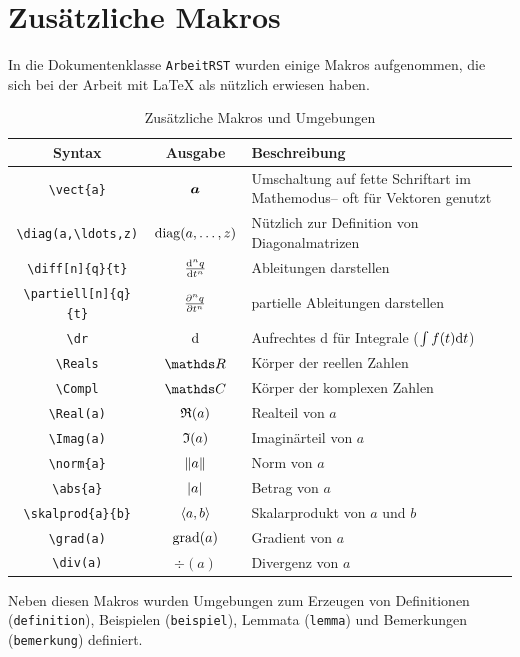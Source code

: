 \section{Zusätzliche Makros}
In die Dokumentenklasse \texttt{ArbeitRST} wurden einige Makros aufgenommen, die sich bei der Arbeit mit \LaTeX{} als nützlich erwiesen haben.
\begin{table}[htbp]
\centering
\caption{Zusätzliche Makros und Umgebungen}
\begin{tabular}{ccp{9cm}}
Syntax & Ausgabe & Beschreibung\\
\toprule
\texttt{\textbackslash vect\{a\}} & $\vect{a}$ & Umschaltung auf fette Schriftart im Mathemodus-- oft für Vektoren genutzt\\[2ex]
\texttt{\textbackslash diag(a,\textbackslash ldots,z)} & $\diag(a,\ldots,z)$ & Nützlich zur Definition von Diagonalmatrizen\\[2ex]
\texttt{\textbackslash diff[n]\{q\}\{t\}} & $\diff[n]{q}{t}$ & Ableitungen darstellen\\[2ex]
\texttt{\textbackslash partiell[n]\{q\}\{t\}} & $\partiell[n]{q}{t}$ & partielle Ableitungen darstellen\\[2ex]
\texttt{\textbackslash dr} &$\dr$ &Aufrechtes d für Integrale ($\int f(t) \dr t$)\\[2ex]
\texttt{\textbackslash Reals} & $\Reals$ & Körper der reellen Zahlen\\[2ex]
\texttt{\textbackslash Compl} & $\Compl$ & Körper der komplexen Zahlen\\[2ex]
\texttt{\textbackslash Real(a)} & $\Real(a)$ & Realteil von $a$\\[2ex]
\texttt{\textbackslash Imag(a)} & $\Imag(a)$ & Imaginärteil von $a$\\[2ex]
\texttt{\textbackslash norm\{a\}} & $\norm{a}$ & Norm von $a$\\[2ex]
\texttt{\textbackslash abs\{a\}} & $\abs{a}$ & Betrag von $a$\\[2ex]
\texttt{\textbackslash skalprod\{a\}\{b\}} & $\skalprod{a}{b}$ & Skalarprodukt von $a$ und $b$\\[2ex]
\texttt{\textbackslash grad(a)} & $\grad(a)$ & Gradient von $a$\\[2ex]
\texttt{\textbackslash div(a)} & $\div(a)$ & Divergenz von $a$\\
\bottomrule
\end{tabular}
\end{table}


Neben diesen Makros wurden Umgebungen zum Erzeugen von Definitionen (\verb|definition|), Beispielen (\verb|beispiel|), Lemmata (\verb|lemma|) und Bemerkungen (\verb|bemerkung|) definiert.


